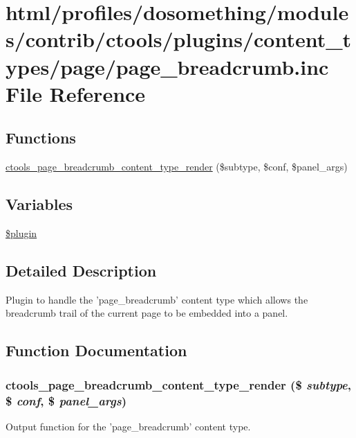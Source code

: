\hypertarget{page__breadcrumb_8inc}{
\section{html/profiles/dosomething/modules/contrib/ctools/plugins/content\_\-types/page/page\_\-breadcrumb.inc File Reference}
\label{page__breadcrumb_8inc}
}
\subsection*{Functions}
\begin{DoxyCompactItemize}
\item 
\hyperlink{page__breadcrumb_8inc_a6da7e31a7abc02c03e31cb312b67821d}{ctools\_\-page\_\-breadcrumb\_\-content\_\-type\_\-render} (\$subtype, \$conf, \$panel\_\-args)
\end{DoxyCompactItemize}
\subsection*{Variables}
\begin{DoxyCompactItemize}
\item 
\hyperlink{page__breadcrumb_8inc_ada8a7130088351710bb02ed622d6bf65}{\$plugin}
\end{DoxyCompactItemize}


\subsection{Detailed Description}
Plugin to handle the 'page\_\-breadcrumb' content type which allows the breadcrumb trail of the current page to be embedded into a panel. 

\subsection{Function Documentation}
\hypertarget{page__breadcrumb_8inc_a6da7e31a7abc02c03e31cb312b67821d}{
\subsubsection[{ctools\_\-page\_\-breadcrumb\_\-content\_\-type\_\-render}]{\setlength{\rightskip}{0pt plus 5cm}ctools\_\-page\_\-breadcrumb\_\-content\_\-type\_\-render (\$ {\em subtype}, \/  \$ {\em conf}, \/  \$ {\em panel\_\-args})}}
\label{page__breadcrumb_8inc_a6da7e31a7abc02c03e31cb312b67821d}
Output function for the 'page\_\-breadcrumb' content type.

